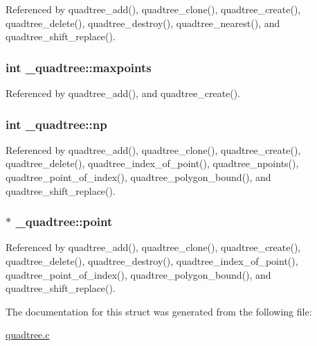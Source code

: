 Referenced by quadtree\+\_\+add(), quadtree\+\_\+clone(), quadtree\+\_\+create(), quadtree\+\_\+delete(), quadtree\+\_\+destroy(), quadtree\+\_\+nearest(), and quadtree\+\_\+shift\+\_\+replace().

\subsubsection[{\texorpdfstring{maxpoints}{maxpoints}}]{\setlength{\rightskip}{0pt plus 5cm}int \+\_\+quadtree\+::maxpoints}\hypertarget{struct__quadtree_a53848ad68be23762139a4137bef2f282}{}\label{struct__quadtree_a53848ad68be23762139a4137bef2f282}


Referenced by quadtree\+\_\+add(), and quadtree\+\_\+create().

\subsubsection[{\texorpdfstring{np}{np}}]{\setlength{\rightskip}{0pt plus 5cm}int \+\_\+quadtree\+::np}\hypertarget{struct__quadtree_a429eeb0eb80c3dba555fd293ff4344f1}{}\label{struct__quadtree_a429eeb0eb80c3dba555fd293ff4344f1}


Referenced by quadtree\+\_\+add(), quadtree\+\_\+clone(), quadtree\+\_\+create(), quadtree\+\_\+delete(), quadtree\+\_\+index\+\_\+of\+\_\+point(), quadtree\+\_\+npoints(), quadtree\+\_\+point\+\_\+of\+\_\+index(), quadtree\+\_\+polygon\+\_\+bound(), and quadtree\+\_\+shift\+\_\+replace().

\subsubsection[{\texorpdfstring{point}{point}}]{$\ast$ \+\_\+quadtree\+::point}\hypertarget{struct__quadtree_a2853d8425a718e2a294f6ccd9ddaecdb}{}\label{struct__quadtree_a2853d8425a718e2a294f6ccd9ddaecdb}


Referenced by quadtree\+\_\+add(), quadtree\+\_\+clone(), quadtree\+\_\+create(), quadtree\+\_\+delete(), quadtree\+\_\+destroy(), quadtree\+\_\+index\+\_\+of\+\_\+point(), quadtree\+\_\+point\+\_\+of\+\_\+index(), quadtree\+\_\+polygon\+\_\+bound(), and quadtree\+\_\+shift\+\_\+replace().



The documentation for this struct was generated from the following file\+:\begin{DoxyCompactItemize}
\item 
\hyperlink{quadtree_8c}{quadtree.\+c}\end{DoxyCompactItemize}
